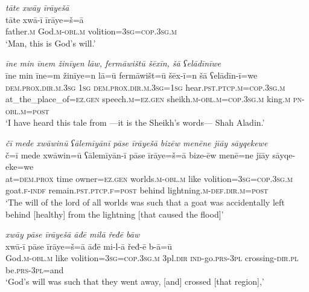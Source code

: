\ea \label{ZB.34}
\textit{tāte xwāy īrāyešā} \\ 
\gll tāte xwā-ī īrāye=š=ā \\ 
 father\textsc{.m} God\textsc{.m}\textsc{-obl}\textsc{.m} volition\textsc{=3sg}\textsc{=cop}\textsc{.3sg}\textsc{.m} \\ 
\glt `Man, this is God’s will.'
\z 
 
\ea \label{ZB.37}
\textit{īne min īnem žinīyen lāw, fermāwištū šēxīn, šā ʕelādīnīwe} \\ 
\gll īne min īne=m žinīye=n lā=ū fermāwišt=ū šēx-ī=n šā ʕelādīn-ī=we \\ 
 \textsc{dem.prox}\textsc{.dir}\textsc{.m}\textsc{.3sg} \textsc{1sg} \textsc{dem.prox}\textsc{.dir}\textsc{.m}\textsc{.3sg}\textsc{=\textsc{1sg}} hear\textsc{.pst}\textsc{.ptcp}\textsc{.m}\textsc{=cop}\textsc{.3sg}\textsc{.m} at\_the\_place\_of\textsc{\textsc{=ez.gen}} speech\textsc{.m}\textsc{\textsc{=ez.gen}} sheikh\textsc{.m}\textsc{-obl}\textsc{.m}\textsc{=cop}\textsc{.3sg}\textsc{.m} king\textsc{.m} \textsc{pn}\textsc{-obl}\textsc{.m}\textsc{=\textsc{post}} \\ 
\glt `I have heard this tale from —it is the Sheikh’s words— Shah Aladin.'
\z 
 
\ea \label{ZB.42}
\textit{čī mede xwāwinū ʕālemīyānī pāse īrāyešā bizēw menēne jīāy sāyqekewe} \\ 
\gll č=ī mede xwāwin=ū ʕālemīyān-ī pāse īrāye=š=ā bize-ēw menē=ne jīāy sāyqe-eke=we \\ 
 at=\textsc{dem.prox} time owner\textsc{\textsc{=ez.gen}} worlds\textsc{.m}\textsc{-obl}\textsc{.m} like volition\textsc{=3sg}\textsc{=cop}\textsc{.3sg}\textsc{.m} goat\textsc{.f}\textsc{-indf} remain\textsc{.pst}\textsc{.ptcp}\textsc{.f}\textsc{=\textsc{post}} behind lightning\textsc{.m}\textsc{-def}\textsc{.dir}\textsc{.m}\textsc{=\textsc{post}} \\ 
\glt `The will of the lord of all worlds was such that a goat was accidentally left behind [healthy] from the lightning [that caused the flood]'
\z 
 
\ea \label{ZB.43}
\textit{xwāy pāse īrāyešā āđē milā řeđē bāw} \\ 
\gll xwā-ī pāse īrāye=š=ā āđē mi-l-ā řeđ-ē b-ā=ū \\ 
 God\textsc{.m}\textsc{-obl}\textsc{.m} like volition\textsc{=3sg}\textsc{=cop}\textsc{.3sg}\textsc{.m} 3pl\textsc{.dir} \textsc{ind-}go\textsc{.prs}\textsc{-3pl} crossing\textsc{-dir}\textsc{.pl} be\textsc{.prs}\textsc{-3pl}=and \\ 
\glt `God’s will was such that they went away, [and] crossed [that region],'
\z 
 
